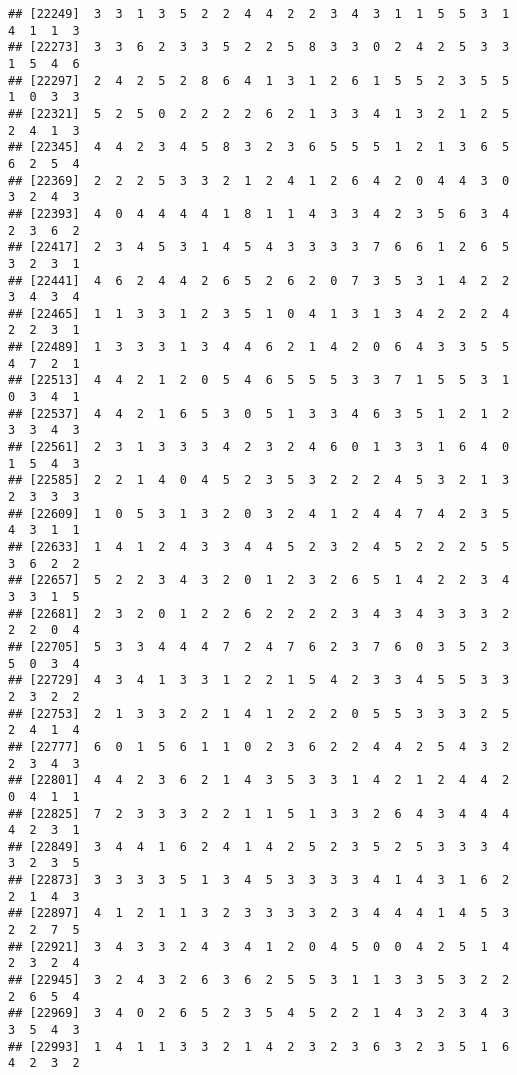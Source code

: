 \documentclass[
]{article}
\begin{document}
\begin{verbatim}
## [22249]  3  3  1  3  5  2  2  4  4  2  2  3  4  3  1  1  5  5  3  1  4  1  1  3
## [22273]  3  3  6  2  3  3  5  2  2  5  8  3  3  0  2  4  2  5  3  3  1  5  4  6
## [22297]  2  4  2  5  2  8  6  4  1  3  1  2  6  1  5  5  2  3  5  5  1  0  3  3
## [22321]  5  2  5  0  2  2  2  2  6  2  1  3  3  4  1  3  2  1  2  5  2  4  1  3
## [22345]  4  4  2  3  4  5  8  3  2  3  6  5  5  5  1  2  1  3  6  5  6  2  5  4
## [22369]  2  2  2  5  3  3  2  1  2  4  1  2  6  4  2  0  4  4  3  0  3  2  4  3
## [22393]  4  0  4  4  4  4  1  8  1  1  4  3  3  4  2  3  5  6  3  4  2  3  6  2
## [22417]  2  3  4  5  3  1  4  5  4  3  3  3  3  7  6  6  1  2  6  5  3  2  3  1
## [22441]  4  6  2  4  4  2  6  5  2  6  2  0  7  3  5  3  1  4  2  2  3  4  3  4
## [22465]  1  1  3  3  1  2  3  5  1  0  4  1  3  1  3  4  2  2  2  4  2  2  3  1
## [22489]  1  3  3  3  1  3  4  4  6  2  1  4  2  0  6  4  3  3  5  5  4  7  2  1
## [22513]  4  4  2  1  2  0  5  4  6  5  5  5  3  3  7  1  5  5  3  1  0  3  4  1
## [22537]  4  4  2  1  6  5  3  0  5  1  3  3  4  6  3  5  1  2  1  2  3  3  4  3
## [22561]  2  3  1  3  3  3  4  2  3  2  4  6  0  1  3  3  1  6  4  0  1  5  4  3
## [22585]  2  2  1  4  0  4  5  2  3  5  3  2  2  2  4  5  3  2  1  3  2  3  3  3
## [22609]  1  0  5  3  1  3  2  0  3  2  4  1  2  4  4  7  4  2  3  5  4  3  1  1
## [22633]  1  4  1  2  4  3  3  4  4  5  2  3  2  4  5  2  2  2  5  5  3  6  2  2
## [22657]  5  2  2  3  4  3  2  0  1  2  3  2  6  5  1  4  2  2  3  4  3  3  1  5
## [22681]  2  3  2  0  1  2  2  6  2  2  2  2  3  4  3  4  3  3  3  2  2  2  0  4
## [22705]  5  3  3  4  4  4  7  2  4  7  6  2  3  7  6  0  3  5  2  3  5  0  3  4
## [22729]  4  3  4  1  3  3  1  2  2  1  5  4  2  3  3  4  5  5  3  3  2  3  2  2
## [22753]  2  1  3  3  2  2  1  4  1  2  2  2  0  5  5  3  3  3  2  5  2  4  1  4
## [22777]  6  0  1  5  6  1  1  0  2  3  6  2  2  4  4  2  5  4  3  2  2  3  4  3
## [22801]  4  4  2  3  6  2  1  4  3  5  3  3  1  4  2  1  2  4  4  2  0  4  1  1
## [22825]  7  2  3  3  3  2  2  1  1  5  1  3  3  2  6  4  3  4  4  4  4  2  3  1
## [22849]  3  4  4  1  6  2  4  1  4  2  5  2  3  5  2  5  3  3  3  4  3  2  3  5
## [22873]  3  3  3  3  5  1  3  4  5  3  3  3  3  4  1  4  3  1  6  2  2  1  4  3
## [22897]  4  1  2  1  1  3  2  3  3  3  3  2  3  4  4  4  1  4  5  3  2  2  7  5
## [22921]  3  4  3  3  2  4  3  4  1  2  0  4  5  0  0  4  2  5  1  4  2  3  2  4
## [22945]  3  2  4  3  2  6  3  6  2  5  5  3  1  1  3  3  5  3  2  2  2  6  5  4
## [22969]  3  4  0  2  6  5  2  3  5  4  5  2  2  1  4  3  2  3  4  3  3  5  4  3
## [22993]  1  4  1  1  3  3  2  1  4  2  3  2  3  6  3  2  3  5  1  6  4  2  3  2

\end{verbatim}
\end{document}

